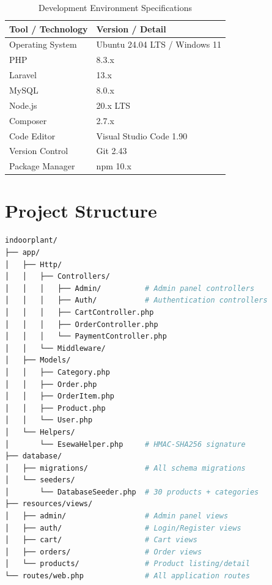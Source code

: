 \documentclass[12pt,a4paper]{report}
\begin{document}
\begin{table}[H]
\centering
\caption{Development Environment Specifications}
\begin{tabular}{@{}ll@{}}
\toprule
\textbf{Tool / Technology} & \textbf{Version / Detail} \\
\midrule
Operating System     & Ubuntu 24.04 LTS / Windows 11 \\
PHP                  & 8.3.x \\
Laravel              & 13.x \\
MySQL                & 8.0.x \\
Node.js              & 20.x LTS \\
Composer             & 2.7.x \\
Code Editor          & Visual Studio Code 1.90 \\
Version Control      & Git 2.43 \\
Package Manager      & npm 10.x \\
\bottomrule
\end{tabular}
\end{table}

\section{Project Structure}

\begin{lstlisting}[language=bash, caption={Laravel Project Directory Structure}]
indoorplant/
├── app/
│   ├── Http/
│   │   ├── Controllers/
│   │   │   ├── Admin/          # Admin panel controllers
│   │   │   ├── Auth/           # Authentication controllers
│   │   │   ├── CartController.php
│   │   │   ├── OrderController.php
│   │   │   └── PaymentController.php
│   │   └── Middleware/
│   ├── Models/
│   │   ├── Category.php
│   │   ├── Order.php
│   │   ├── OrderItem.php
│   │   ├── Product.php
│   │   └── User.php
│   └── Helpers/
│       └── EsewaHelper.php     # HMAC-SHA256 signature
├── database/
│   ├── migrations/             # All schema migrations
│   └── seeders/
│       └── DatabaseSeeder.php  # 30 products + categories
├── resources/views/
│   ├── admin/                  # Admin panel views
│   ├── auth/                   # Login/Register views
│   ├── cart/                   # Cart views
│   ├── orders/                 # Order views
│   └── products/               # Product listing/detail
└── routes/web.php              # All application routes
\end{lstlisting}
\end{document}
